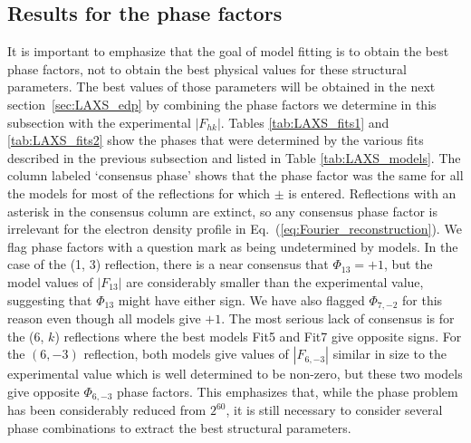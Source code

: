 \subsection{Results for the phase factors}\label{sec:LAXS_phases_results}
It is important to emphasize that the goal of model fitting is to obtain the 
best phase factors, not to obtain the best physical values for these 
structural parameters.  The best values of those parameters will be obtained 
in the next section~\ref{sec:LAXS_edp} by combining the phase factors we 
determine in this subsection with the experimental $|F_{hk}|$.  
Tables \ref{tab:LAXS_fits1} and \ref{tab:LAXS_fits2} show the phases that 
were determined by the various fits described in the previous subsection and 
listed in Table \ref{tab:LAXS_models}. The column labeled `consensus phase'
shows that the phase factor was the same for all the models for most of the 
reflections for which $\pm$ is entered.  Reflections with an asterisk in the 
consensus column are extinct, so any consensus phase factor is irrelevant for 
the electron density profile in Eq.~(\ref{eq:Fourier_reconstruction}). 
We flag phase factors with a question 
mark as being undetermined by models.  In the case of the (1, 3) reflection, 
there is a near consensus that $\Phi_{13}=+1$, but the model values of 
$|F_{13}|$ are considerably smaller than the experimental value, suggesting 
that $\Phi_{13}$ might have either sign.  We have also flagged $\Phi_{7,-2}$ 
for this reason even though all models give $+1$. The most serious lack of 
consensus is for the (6, $k$) reflections where the best models Fit5 and Fit7 
give opposite signs. For the $(6,-3)$ reflection, both models give values of 
$|F_{6,-3}|$ similar in size to the experimental value which is well 
determined to be non-zero, but these two models give opposite $\Phi_{6,-3}$ 
phase factors.  This emphasizes that, while the phase problem has been 
considerably reduced from $2^{60}$, it is still necessary to consider several 
phase combinations to extract the best structural parameters.

